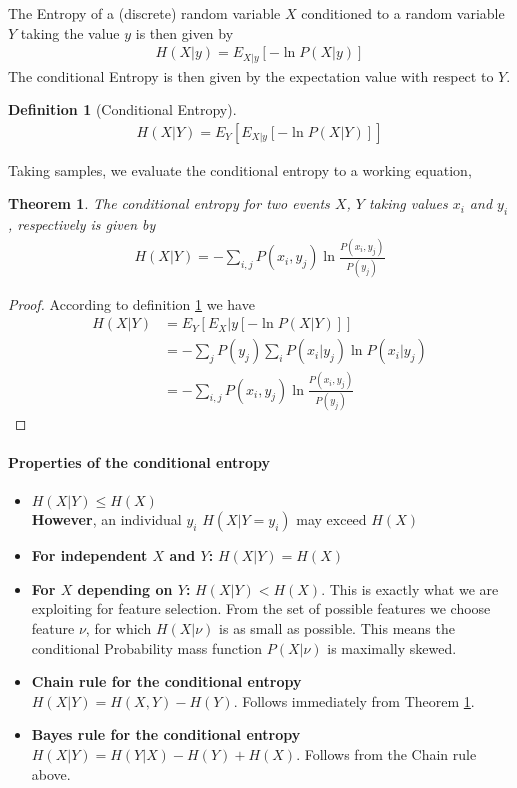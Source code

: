 \documentclass[10pt,a4paper]{article}
\newtheorem{theorem}{Theorem}
\newtheorem{definition}{Definition}
\begin{document}
The Entropy of a (discrete) random variable $X$ conditioned to a random variable $Y$ taking the value $y$ is then given by
\begin{align}
H(X|y) = E_{X|y}[-\ln P(X|y)]
\end{align}
The conditional Entropy is then given by the expectation value with respect to $Y$.
\begin{definition}[Conditional Entropy]  \label{def_cond_entropy}
\begin{align}
H(X|Y) = E_Y[E_{X|y}[-\ln P (X|Y)]]
\end{align}
\end{definition}
Taking samples, we evaluate the conditional entropy to a working equation,
\begin{theorem} \label{thm_conditional_entropy}
The conditional entropy for two events $X$, $Y$ taking values $x_i$ and $y_i$, respectively is given by
\begin{align}
H(X|Y) = - \sum_{i,j} P(x_i,y_j)\ln \frac{P(x_i, y_j)}{P(y_j)}
\end{align}
\end{theorem}
\begin{proof} According to definition \ref{def_cond_entropy} we have
\begin{align*}
H(X|Y) 	&= E_Y[E_X|y[-\ln P (X|Y)]] \\
		&= - \sum_j P(y_j) \sum_i P(x_i|y_j) \ln P (x_i|y_j) \\ 
		&= - \sum_{i,j} P(x_i, y_j) \ln \frac{P(x_i,y_j)}{P(y_j)}  
\end{align*}
\end{proof}
\paragraph*{Properties of the conditional entropy}
\begin{itemize}
\item $H(X|Y) \leq H(X)$ \\
\textbf{However}, an individual $y_i$ $H(X|Y=y_i)$ may exceed $H(X)$
\item \textbf{For independent $X$ and $Y$:} $H(X|Y) = H(X)$ 
\item \textbf{For $X$ depending on $Y$:} $H(X|Y) < H(X)$.
This is exactly what we are exploiting for feature selection. 
From the set of possible features  we choose feature $\nu$, for which  $H(X|\nu)$ is as small as possible. This means the conditional Probability mass function $P(X|\nu)$ is maximally skewed.
\item \textbf{Chain rule for the conditional entropy} \\
 $H(X|Y)=H(X,Y)-H(Y)$. Follows immediately from Theorem \ref{thm_conditional_entropy}.
\item \textbf{Bayes rule for the conditional entropy} \\
$H(X|Y)=H(Y|X)-H(Y) + H(X)$. Follows from the Chain rule above.
\end{itemize}
\end{document}
